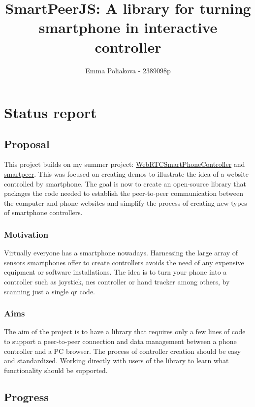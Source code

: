 \documentclass[11pt]{article}
\title{SmartPeerJS: A library for turning smartphone in interactive controller}
\author{Emma Poliakova - 2389098p}
\begin{document}
    \maketitle
    
    
     

\section{Status report}

\subsection{Proposal}\label{proposal}

This project builds on my summer project: \href{https://github.com/EmmaPoliakova/WebRTCSmartphoneController}{WebRTCSmartPhoneController} and \href{https://github.com/EmmaPoliakova/smartpeer}{smartpeer}. This was focused on creating demos to illustrate the idea of a website controlled by smartphone. The goal is now to create an open-source library that packages the code needed to establish the peer-to-peer communication between the computer and phone websites and simplify the process of creating new types of smartphone controllers. 


\subsubsection{Motivation}\label{motivation}

 Virtually everyone has a smartphone nowadays. Harnessing the large array of sensors smartphones offer to create controllers avoids the need of any expensive equipment or software installations. The idea is to turn your phone into a controller such as joystick, nes controller or hand tracker among others, by scanning just a single qr code.

\subsubsection{Aims}\label{aims}
The aim of the project is to have a library that requires only a few lines of code to support a peer-to-peer connection and data management between a phone controller and a PC browser. The process of controller creation should be easy and standardized. Working directly with users of the library to learn what functionality should be supported.

\subsection{Progress}\label{progress}
\end{document}
